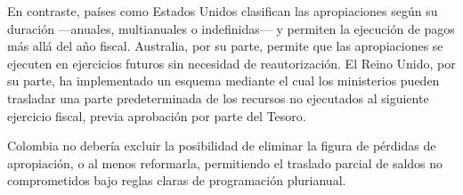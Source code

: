 En contraste, países como Estados Unidos clasifican las apropiaciones según su duración —anuales, multianuales o indefinidas— y permiten la ejecución de pagos más allá del año fiscal. Australia, por su parte, permite que las apropiaciones se ejecuten en ejercicios futuros sin necesidad de reautorización. El Reino Unido, por su parte, ha implementado un esquema mediante el cual los ministerios pueden trasladar una parte predeterminada de los recursos no ejecutados al siguiente ejercicio fiscal, previa aprobación por parte del Tesoro. 

Colombia no debería excluir la posibilidad de eliminar la figura de pérdidas de apropiación, o al menos reformarla, permitiendo el traslado parcial de saldos no comprometidos bajo reglas claras de programación plurianual. 



